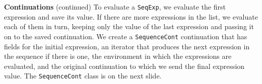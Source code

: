 \begin{minipage}[t]{\sw}
\slidenumber
\LARGE
{\bf Continuations} (continued)\exx
To evaluate a \verb'SeqExp',
we evaluate the first expression and save its value.
If there are more expressions in the list,
we evaluate each of them in turn,
keeping only the value of the last expression and passing it on
to the saved continuation.
We create a \verb'SequenceCont' continuation
that has fields for the initial expression,
an iterator that produces the next expression
in the sequence if there is one,
the environment in which the expressions are evaluated,
and the original continuation to which we send
the final expression value.\exx
The \verb'SequenceCont' class is on the next slide.
\end{minipage}
